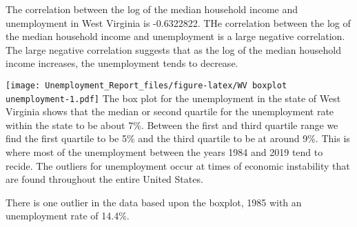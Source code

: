 \documentclass[
]{article}
\newenvironment{Shaded}{\begin{snugshade}}{\end{snugshade}}
\newcommand{\CommentTok}[1]{\textcolor[rgb]{0.56,0.35,0.01}{\textit{#1}}}
\newcommand{\DataTypeTok}[1]{\textcolor[rgb]{0.13,0.29,0.53}{#1}}
\newcommand{\DecValTok}[1]{\textcolor[rgb]{0.00,0.00,0.81}{#1}}
\newcommand{\KeywordTok}[1]{\textcolor[rgb]{0.13,0.29,0.53}{\textbf{#1}}}
\newcommand{\NormalTok}[1]{#1}
\newcommand{\OperatorTok}[1]{\textcolor[rgb]{0.81,0.36,0.00}{\textbf{#1}}}
\newcommand{\StringTok}[1]{\textcolor[rgb]{0.31,0.60,0.02}{#1}}
\begin{document}
The correlation between the log of the median household income and
unemployment in West Virginia is -0.6322822. THe correlation between the
log of the median household income and unemployment is a large negative
correlation. The large negative correlation suggests that as the log of
the median household income increases, the unemployment tends to
decrease.

\begin{Shaded}
\end{Shaded}

\texttt{[image: Unemployment\_Report\_files/figure-latex/WV boxplot unemployment-1.pdf]}
The box plot for the unemployment in the state of West Virginia shows
that the median or second quartile for the unemployment rate within the
state to be about 7\%. Between the first and third quartile range we
find the first quartile to be 5\% and the third quartile to be at around
9\%. This is where most of the unemployment between the years 1984 and
2019 tend to recide. The outliers for unemployment occur at times of
economic instability that are found throughout the entire United States.

There is one outlier in the data based upon the boxplot, 1985 with an
unemployment rate of 14.4\%.

\begin{Shaded}
\end{Shaded}
\end{document}
